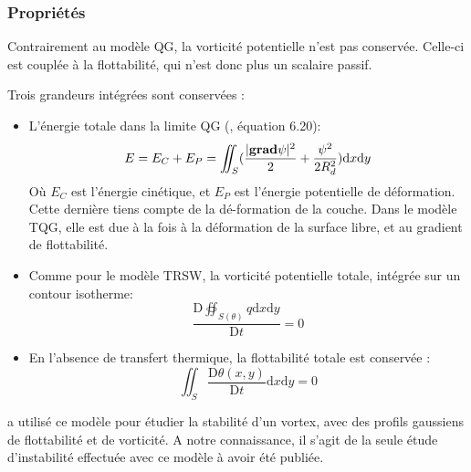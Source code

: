 \subsubsection{Propriétés}
Contrairement au modèle QG, la vorticité potentielle n'est pas conservée. Celle-ci est couplée à la flottabilité, qui n'est donc plus un scalaire passif.

Trois grandeurs intégrées sont conservées :
\begin{itemize}
	\item L'énergie totale dans la limite QG (\parencite{Warneford2013}, équation 6.20): 
	 \begin{equation}
	 	E = E_C + E_P = \iint_S (\frac{\lvert \mathrm{\mathbf{grad}}{\psi}\rvert^2}{2}+\frac{\psi^2}{2R_d^2})\mathrm{d}x\mathrm{d}y 
	 \end{equation}
	 Où $E_C$ est l'énergie cinétique, et $E_P$ est l'énergie potentielle de déformation. Cette dernière tiens compte de la dé-formation de la couche. Dans le modèle TQG, elle est due à la fois à la déformation de la surface libre, et au gradient de flottabilité.
	\item Comme pour le modèle TRSW, la vorticité potentielle totale, intégrée sur un contour isotherme: 
	\begin{equation}
		\frac{\mathrm{D} \oiint_{S(\theta)} q \mathrm{d}x\mathrm{d}y}{\mathrm{D} t} = 0
	\end{equation}
	\item En l'absence de transfert thermique, la flottabilité totale est conservée : 
	\begin{equation}
		\iint_S \frac{\mathrm{D}\theta(x, y)}{\mathrm{D} t} \mathrm{d}x\mathrm{d}y = 0
\end{equation}
\end{itemize}

\parencite{Carton2025} a utilisé ce modèle pour étudier la stabilité d'un vortex, avec des profils gaussiens de flottabilité  et de vorticité. A notre connaissance, il s'agit de la seule étude d'instabilité effectuée avec ce modèle à avoir été publiée.